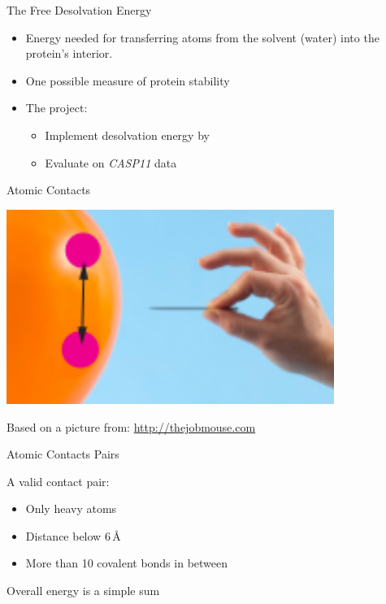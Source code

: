 \begin{frame}{The Free Desolvation Energy}
    \begin{itemize}[<+->]
        \item Energy needed for transferring atoms from the solvent (water) into
        the protein's interior.
        \item One possible measure of protein stability
        \item The project:
        \begin{itemize}
            \item Implement desolvation energy by \cite{Zhang1997}
            \item Evaluate on \emph{CASP11} data
        \end{itemize}
    \end{itemize}
\end{frame}
% 
\begin{frame}{Atomic Contacts}
    \begin{center}
        \includegraphics[width=0.8\textwidth]{ace.png}
    \end{center}
    \begin{flushright}
        \tiny
        \color{gray}Based on a picture from: \url{http://thejobmouse.com}
    \end{flushright}
\end{frame}
%
\begin{frame}{Atomic Contacts Pairs}
    \begin{center}
    \end{center}
    A valid contact pair:
    \begin{itemize}
        \item Only heavy atoms
        \item Distance below 6\,\AA
        \item More than 10 covalent bonds in between\\
    \end{itemize}
    Overall energy is a simple sum
\end{frame}
